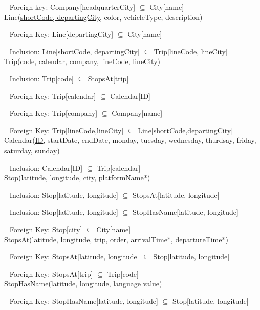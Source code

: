 	$ \ \ $ Foreign key: Company[headquarterCity] $\subseteq$ City[name] \\


	Line(\uline{shortCode, departingCity}, color, vehicleType, description)

	$ \ \ $ Foreign Key: Line[departingCity] $\subseteq$ City[name]

	$ \ \ $ Inclusion: Line[shortCode, departingCity] $\subseteq$ Trip[lineCode, lineCity] \\


	Trip(\uline{code}, calendar, company, lineCode, lineCity)

	$ \ \ $ Inclusion: Trip[code] $\subseteq$ StopsAt[trip]

	$ \ \ $ Foreign Key: Trip[calendar] $\subseteq$ Calendar[ID]

	$ \ \ $ Foreign Key: Trip[company] $\subseteq$ Company[name]

	$ \ \ $ Foreign Key: Trip[lineCode,lineCity] $\subseteq$ Line[shortCode,departingCity] \\


	Calendar(\uline{ID}, startDate, endDate, {\small monday, tuesday, wednesday, thurdsay, friday, saturday, sunday) }

	$ \ \ $ Inclusion: Calendar[ID] $\subseteq$ Trip[calendar] \\


	Stop(\uline{latitude, longitude}, city, platformName*)

	$ \ \ $ Inclusion: Stop[latitude, longitude] $\subseteq$ StopsAt[latitude, longitude]

	$ \ \ $ Inclusion: Stop[latitude, longitude] $\subseteq$ StopHasName[latitude, longitude]

	$ \ \ $ Foreign Key: Stop[city] $\subseteq$ City[name] \\

	\newpage
	StopsAt(\uline{latitude, longitude, trip}, order, arrivalTime*, departureTime*)

	$ \ \ $ Foreign Key: StopsAt[latitude, longitude] $\subseteq$ Stop[latitude, longitude]

	$ \ \ $ Foreign Key: StopsAt[trip] $\subseteq$ Trip[code] \\


	StopHasName(\uline{latitude, longitude, language} value)

	$ \ \ $ Foreign Key: StopHasName[latitude, longitude] $\subseteq$ Stop[latitude, longitude] \\



